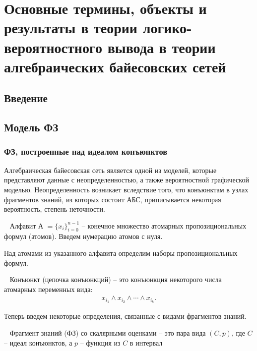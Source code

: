 \section{Основные термины, объекты и результаты в теории логико-вероятностного вывода в теории алгебраических байесовских сетей}
\subsection{Введение}

\subsection{Модель ФЗ}
	\subsubsection{ФЗ, построенные над идеалом конъюнктов}
	Алгебраическая байесовская сеть является одной из моделей, которые представляют данные с неопределенностью, а также вероятностной графической моделью. Неопределенность возникает вследствие того, что конъюнктам в узлах фрагментов знаний, из которых состоит АБС, приписывается некоторая вероятность, степень неточности. 
          
           \begin{Def}
            ~\cite{AVS_2011}
                Алфавит А $= \{ x_{i}\}^{n - 1}_{i = 0}$ -- конечное множество атомарных пропозициональных формул (атомов). Введем нумерацию атомов с нуля.
            \end{Def}


           Над атомами из указанного алфавита определим  наборы пропозициональных формул.
            
            \begin{Def}
            ~\cite{AVS_2011}
                Конъюнкт (цепочка конъюнкций) -- это конъюнкция некоторого числа атомарных переменных вида:
                \begin{eqnarray*}
                    x_{i_{1}} \wedge x_{i_{2}} \wedge \cdots \wedge x_{i_{k}}.
                \end{eqnarray*}
            \end{Def}
            
 
            Теперь введем некоторые определения, связанные с видами фрагментов знаний.
        
            \begin{Def}
                ~\cite{AVS_2011}
                Фрагмент знаний (ФЗ) со скалярными оценками -- это пара вида \begin{math}(C,p)\end{math}, где \begin{math}C\end{math} -- идеал конъюнктов, а \begin{math}p\end{math} --  функция из \begin{math}C\end{math} в интервал  
                \begin{math}
                [0;1]
                \end{math}
            \end{Def}
         
